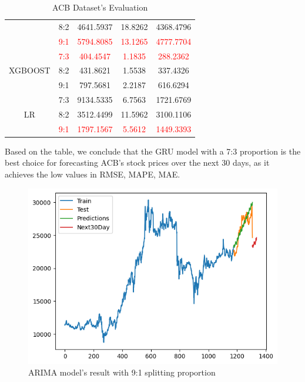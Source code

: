 \documentclass{ieeeojies}
\begin{document}
\begin{table}[H]
\begin{tabular}{|c|c|c|c|c|}
         & 8:2 & 4641.5937 & 18.8262 & 4368.4796 \\ 
         & \textcolor{red}{9:1}  & \textcolor{red}{5794.8085} & \textcolor{red}{13.1265} & \textcolor{red}{4777.7704} \\
         \hline
         \multirow{3}{*}{XGBOOST} 
         & \textcolor{red}{7:3}  & \textcolor{red}{404.4547} & \textcolor{red}{1.1835} & \textcolor{red}{288.2362} \\ 
         & 8:2 & 431.8621 & 1.5538 & 337.4326 \\ 
         & 9:1 & 797.5681 & 2.2187 & 616.6294 \\
         \hline
         \multirow{3}{*}{LR} 
         & 7:3 & 9134.5335 & 6.7563 & 1721.6769 \\ 
         & 8:2 & 3512.4499 & 11.5962 & 3100.1106 \\ 
         & \textcolor{red}{9:1}  & \textcolor{red}{1797.1567} & \textcolor{red}{5.5612} & \textcolor{red}{1449.3393} \\ 
         \hline
    \end{tabular}
    \caption{ACB Dataset's Evaluation}
    \label{vcbdataset}
\end{table}
Based on the table, we conclude that the GRU model with a 7:3 proportion is the best choice for forecasting ACB's stock prices over the next 30 days, as it achieves the low values in RMSE, MAPE, MAE.
\begin{figure}[H]
  \centering
  \begin{minipage}{0.6\linewidth}
    \centering
    \includegraphics[width=\linewidth]{bibliography/diagram/ARIMA-ACB.png}
    \caption{ARIMA model’s result with 9:1 splitting proportion}
    \label{fig8}
  \end{minipage}
\end{figure}
\end{document}
